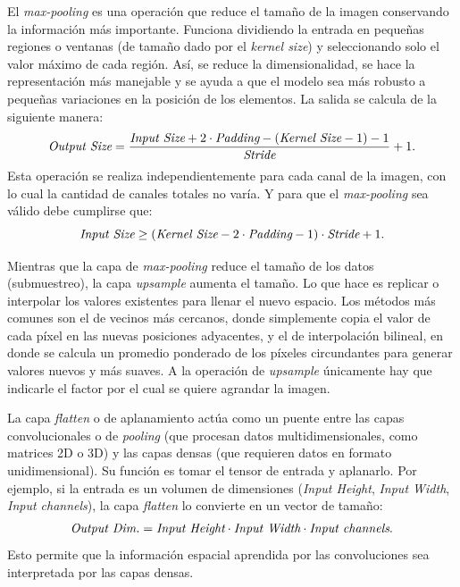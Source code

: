 El \emph{max-pooling} es una operación que reduce el tamaño de la imagen conservando la información más importante. Funciona dividiendo la entrada en pequeñas regiones o ventanas (de tamaño dado por el \emph{kernel size}) y seleccionando solo el valor máximo de cada región. Así, se reduce la dimensionalidad, se hace la representación más manejable y se ayuda a que el modelo sea más robusto a pequeñas variaciones en la posición de los elementos. La salida se calcula de la siguiente manera:
\begin{equation}
    \emph{\text{Output Size}} = \frac{\emph{\text{Input Size}} + 2 \cdot \emph{\text{Padding}} - (\emph{\text{Kernel Size}} - 1) - 1}{\emph{\text{Stride}}} + 1.
\end{equation}
Esta operación se realiza independientemente para cada canal de la imagen, con lo cual la cantidad de canales totales no varía. Y para que el \emph{max-pooling} sea válido debe cumplirse que:
\begin{equation}
    \emph{\text{Input Size}} \geq (\emph{\text{Kernel Size}} - 2\cdot \emph{\text{Padding}} - 1) \cdot \emph{\text{Stride}} + 1.
\end{equation}

Mientras que la capa de \emph{max-pooling} reduce el tamaño de los datos (submuestreo), la capa \emph{upsample} aumenta el tamaño. Lo que hace es replicar o interpolar los valores existentes para llenar el nuevo espacio. Los métodos más comunes son el de vecinos más cercanos, donde simplemente copia el valor de cada píxel en las nuevas posiciones adyacentes, y el de interpolación bilineal, en donde se calcula un promedio ponderado de los píxeles circundantes para generar valores nuevos y más suaves. A la operación de \emph{upsample} únicamente hay que indicarle el factor por el cual se quiere agrandar la imagen.

La capa \emph{flatten} o de aplanamiento actúa como un puente entre las capas convolucionales o de \emph{pooling} (que procesan datos multidimensionales, como matrices 2D o 3D) y las capas densas (que requieren datos en formato unidimensional). Su función es tomar el tensor de entrada y aplanarlo. Por ejemplo, si la entrada es un volumen de dimensiones (\emph{Input Height}, \emph{Input Width}, \emph{Input channels}), la capa \emph{flatten} lo convierte en un vector de tamaño:
\begin{equation}
    \emph{Output Dim.} = \emph{Input Height} \cdot \emph{Input Width} \cdot \emph{Input channels}.
\end{equation}
Esto permite que la información espacial aprendida por las convoluciones sea interpretada por las capas densas.

